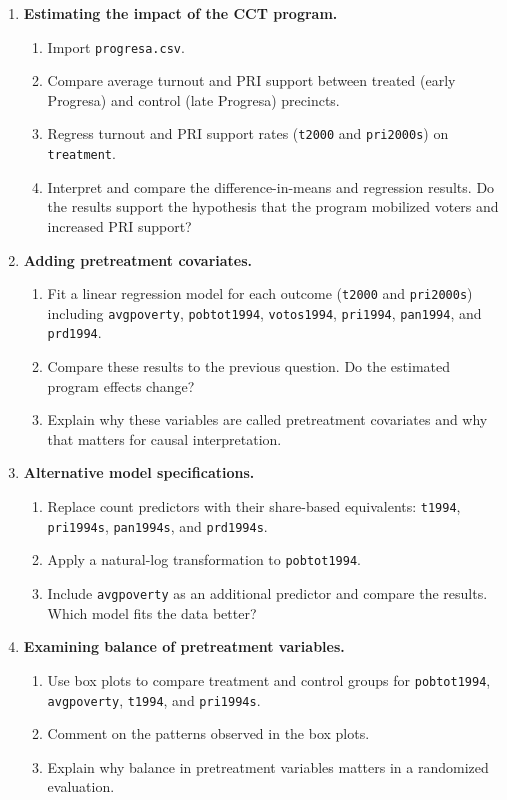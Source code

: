 \documentclass[12pt]{article}
\begin{document}
\begin{enumerate}
    \item \textbf{Estimating the impact of the CCT program.}
    \begin{enumerate}[label=(\alph*)]
        \item Import \texttt{progresa.csv}.
        \item Compare average turnout and PRI support between treated (early Progresa) and control (late Progresa) precincts.
        \item Regress turnout and PRI support rates (\texttt{t2000} and \texttt{pri2000s}) on \texttt{treatment}.
        \item Interpret and compare the difference-in-means and regression results. Do the results support the hypothesis that the program mobilized voters and increased PRI support?
    \end{enumerate}

    \item \textbf{Adding pretreatment covariates.}
    \begin{enumerate}[label=(\alph*)]
        \item Fit a linear regression model for each outcome (\texttt{t2000} and \texttt{pri2000s}) including \texttt{avgpoverty}, \texttt{pobtot1994}, \texttt{votos1994}, \texttt{pri1994}, \texttt{pan1994}, and \texttt{prd1994}.
        \item Compare these results to the previous question. Do the estimated program effects change?
        \item Explain why these variables are called pretreatment covariates and why that matters for causal interpretation.
    \end{enumerate}

    \item \textbf{Alternative model specifications.}
    \begin{enumerate}[label=(\alph*)]
        \item Replace count predictors with their share-based equivalents: \texttt{t1994}, \texttt{pri1994s}, \texttt{pan1994s}, and \texttt{prd1994s}.
        \item Apply a natural-log transformation to \texttt{pobtot1994}.
        \item Include \texttt{avgpoverty} as an additional predictor and compare the results. Which model fits the data better?
    \end{enumerate}

    \item \textbf{Examining balance of pretreatment variables.}
    \begin{enumerate}[label=(\alph*)]
        \item Use box plots to compare treatment and control groups for \texttt{pobtot1994}, \texttt{avgpoverty}, \texttt{t1994}, and \texttt{pri1994s}.
        \item Comment on the patterns observed in the box plots.
        \item Explain why balance in pretreatment variables matters in a randomized evaluation.
    \end{enumerate}


\end{enumerate}
\end{document}
